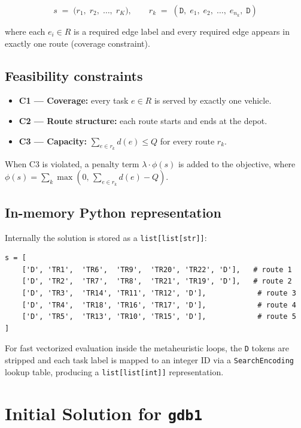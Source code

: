 \documentclass[12pt, a4paper]{article}
\begin{document}
\[
    s \;=\; \bigl(r_1,\; r_2,\; \ldots,\; r_K\bigr),
    \qquad
    r_k \;=\; (\texttt{D},\; e_1,\; e_2,\; \ldots,\; e_{n_k},\; \texttt{D})
\]

where each $e_i \in R$ is a required edge label and every required
edge appears in exactly one route (coverage constraint).

\subsection{Feasibility constraints}

\begin{itemize}
    \item \textbf{C1 — Coverage:} every task $e \in R$ is served by
          exactly one vehicle.
    \item \textbf{C2 — Route structure:} each route starts and ends
          at the depot.
    \item \textbf{C3 — Capacity:} $\sum_{e \in r_k} d(e) \leq Q$
          for every route $r_k$.
\end{itemize}

When C3 is violated, a penalty term $\lambda \cdot \phi(s)$ is added
to the objective, where $\phi(s) = \sum_k \max(0,\,\sum_{e \in r_k} d(e) - Q)$.

\subsection{In-memory Python representation}

Internally the solution is stored as a \texttt{list[list[str]]}:

\begin{verbatim}
s = [
    ['D', 'TR1',  'TR6',  'TR9',  'TR20', 'TR22', 'D'],   # route 1
    ['D', 'TR2',  'TR7',  'TR8',  'TR21', 'TR19', 'D'],   # route 2
    ['D', 'TR3',  'TR14', 'TR11', 'TR12', 'D'],            # route 3
    ['D', 'TR4',  'TR18', 'TR16', 'TR17', 'D'],            # route 4
    ['D', 'TR5',  'TR13', 'TR10', 'TR15', 'D'],            # route 5
]
\end{verbatim}

For fast vectorized evaluation inside the metaheuristic loops, the
\texttt{D} tokens are stripped and each task label is mapped to an
integer ID via a \texttt{SearchEncoding} lookup table, producing a
\texttt{list[list[int]]} representation.

\section{Initial Solution for \texttt{gdb1}}
\end{document}
